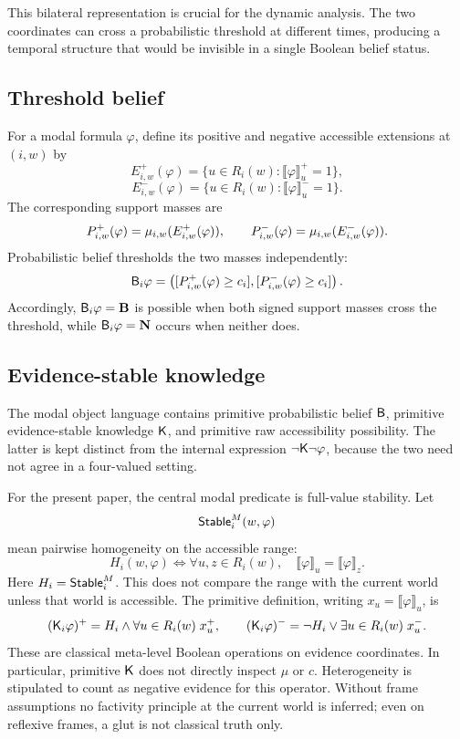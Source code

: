 This bilateral representation is crucial for the dynamic analysis. The two coordinates can cross a probabilistic threshold at different times, producing a temporal structure that would be invisible in a single Boolean belief status.

\subsection{Threshold belief}

For a modal formula \(\varphi\), define its positive and negative accessible extensions at \((i,w)\) by
\[
  E^+_{i,w}(\varphi)
  =\{u\in R_i(w):\llbracket\varphi\rrbracket_u^+=1\},
\]
\[
  E^-_{i,w}(\varphi)
  =\{u\in R_i(w):\llbracket\varphi\rrbracket_u^-=1\}.
\]
The corresponding support masses are
\[
  P^{+}_{i,w}(\varphi)=\mu_{i,w}(E^+_{i,w}(\varphi)),
  \qquad
  P^{-}_{i,w}(\varphi)=\mu_{i,w}(E^-_{i,w}(\varphi)).
\]
Probabilistic belief thresholds the two masses independently:
\[
  \mathsf{B}_i\varphi
  =
  \left(
  [P^{+}_{i,w}(\varphi)\ge c_i],
  [P^{-}_{i,w}(\varphi)\ge c_i]
  \right).
\]
Accordingly, \(\mathsf{B}_i\varphi=\mathbf{B}\) is possible when both signed support masses cross the threshold, while \(\mathsf{B}_i\varphi=\mathbf{N}\) occurs when neither does.

\subsection{Evidence-stable knowledge}

The modal object language contains primitive probabilistic belief \(\mathsf{B}\), primitive evidence-stable knowledge \(\mathsf{K}\), and primitive raw accessibility possibility. The latter is kept distinct from the internal expression \(\neg\mathsf{K}\neg\varphi\), because the two need not agree in a four-valued setting.

For the present paper, the central modal predicate is full-value stability. Let
\[
  \mathsf{Stable}_i^M(w,\varphi)
\]
mean pairwise homogeneity on the accessible range:
\[
 H_i(w,\varphi)\iff\forall u,z\in R_i(w),\quad
 \llbracket\varphi\rrbracket_u=\llbracket\varphi\rrbracket_z.
\]
Here \(H_i=\mathsf{Stable}_i^M\). This does not compare the range with the current world
unless that world is accessible. The primitive definition, writing
\(x_u=\llbracket\varphi\rrbracket_u\), is
\[
 (\mathsf{K}_i\varphi)^+=H_i\land\forall u\in R_i(w)\;x_u^+,
 \qquad
 (\mathsf{K}_i\varphi)^-=\neg H_i\lor\exists u\in R_i(w)\;x_u^-.
\]
These are classical meta-level Boolean operations on evidence coordinates.
In particular, primitive \(\mathsf{K}\) does not directly inspect \(\mu\) or \(c\).
Heterogeneity is stipulated to count as negative evidence for this operator.
Without frame assumptions no factivity principle at the current world is
inferred; even on reflexive frames, a glut is not classical truth only.

